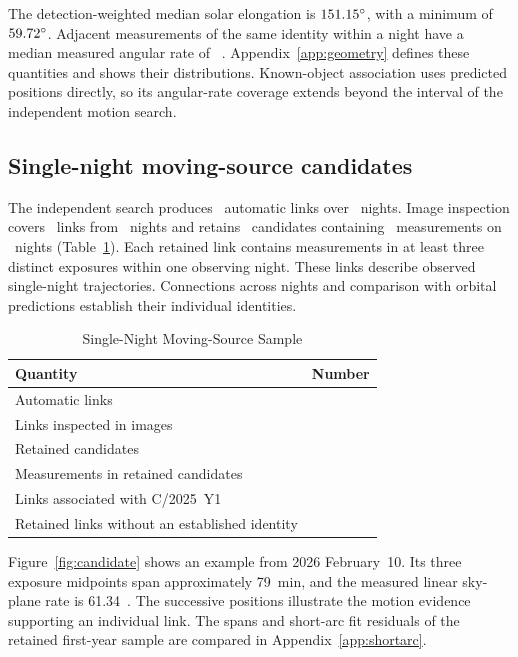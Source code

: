 The detection-weighted median solar elongation is
$151.15^\circ$, with a minimum of
$59.72^\circ$. Adjacent measurements of the same
identity within a night have a median measured angular rate
of \yrMeasuredRate~\rateunit. Appendix~\ref{app:geometry}
defines these quantities and shows their distributions.
Known-object association uses predicted positions directly,
so its angular-rate coverage extends beyond the interval
of the independent motion search.

\subsection{Single-night moving-source candidates}
\label{sec:candidates}

The independent search produces \yrNAuto\ automatic links
over \yrNSearchNights\ nights. Image inspection covers
\yrNReviewed\ links from \yrNReviewNights\ nights and retains
\yrNCandidates\ candidates containing \yrNCandidateMeasurements\
measurements on \yrNCandidateNights\ nights
(Table~\ref{tab:candidates}). Each retained link contains
measurements in at least three distinct exposures within one
observing night. These links describe observed single-night
trajectories. Connections across nights and comparison with
orbital predictions establish their individual identities.

\begin{table}[tbp]
\centering
\caption{Single-Night Moving-Source Sample}
\label{tab:candidates}
\begin{tabular}{lr}
\toprule
Quantity & Number\\
\midrule
Automatic links & \yrNAuto\\
Links inspected in images & \yrNReviewed\\
Retained candidates & \yrNCandidates\\
Measurements in retained candidates & \yrNCandidateMeasurements\\
Links associated with C/2025~Y1 & \yrNCometLinks\\
Retained links without an established identity & \yrNUnidentified\\
\bottomrule
\end{tabular}
\end{table}

Figure~\ref{fig:candidate} shows an example from 2026 February~10.
Its three exposure midpoints span approximately 79~min, and the
measured linear sky-plane rate is 61.34~\rateunit. The successive
positions illustrate the motion evidence supporting an individual
link. The spans and short-arc fit residuals of the retained
first-year sample are compared in Appendix~\ref{app:shortarc}.

